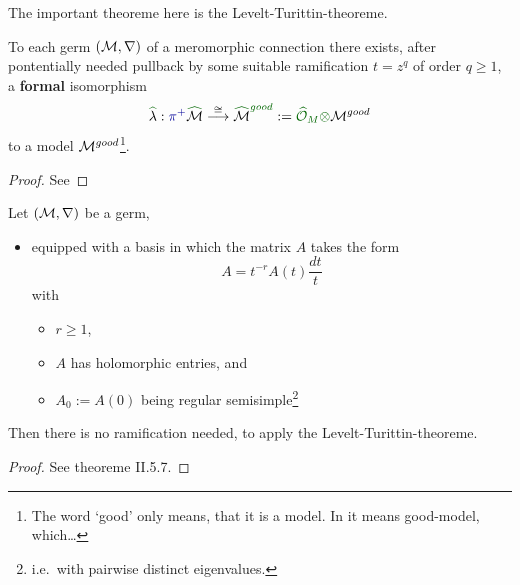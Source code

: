 The important theoreme here is the Levelt-Turittin-theoreme.
\begin{thm}
  To each germ $(\mathcal{M},\nabla)$ of a meromorphic connection there exists, after
  pontentially needed \textcolor{blue!60!black}{pullback by some suitable
  ramification $t=z^q$ of order $q\geq1$}, a
  \textcolor{green!40!black}{\textbf{formal}} isomorphism
  \[
    \textcolor{green!40!black}{\hat{\textcolor{black}{\lambda}}}:
    \textcolor{blue!60!black}{\pi^{+}}
    \textcolor{green!40!black}{\hat{\textcolor{black}{\cM}}}
    \overset{\cong}\longrightarrow
    \textcolor{green!40!black}{\hat{\textcolor{black}{\cM}}^{good}}
    :=\textcolor{green!40!black}{\hat\cO_M\otimes}\cM^{good}
  \]
  to a model $\mathcal{M}^{good}$\footnote{The word `good' only means, that it is a
  model. In \cite{sabbah2007isomonodromic} it means good-model,
  which\dots\TODO}.
\end{thm}
\begin{proof}
  See \TODO
\end{proof}

\begin{prop}
  Let $(\mathcal{M},\nabla)$ be a germ,
  \begin{itemize}
    \item equipped with a basis in which the matrix $A$ takes the form
      \[
        A=t^{-r}A(t)\frac{dt}{t}
      \]
      with
      \begin{itemize}
        \item $r\geq1$,
        \item $A$ has holomorphic entries, and
        \item $A_0:=A(0)$ being regular semisimple\footnote{i.e.\ with
          pairwise distinct eigenvalues.}
      \end{itemize}
  \end{itemize}
  Then there is no ramification needed, to apply the Levelt-Turittin-theoreme.
  \begin{comment}
    Further, all the summands $\cR_\phi$ have rank one, which is not the case
    in general.
  \end{comment}
\end{prop}
\begin{proof}
  See \cite{sabbah2007isomonodromic} theoreme II.5.7.
\end{proof}

